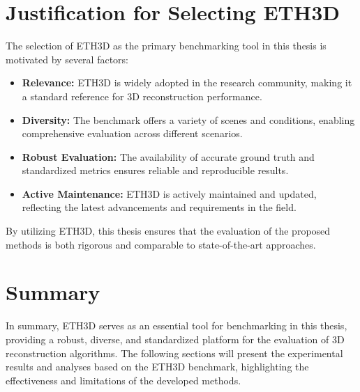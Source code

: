 \section{Justification for Selecting ETH3D}

The selection of ETH3D as the primary benchmarking tool in this thesis is motivated by several factors:

\begin{itemize}
    \item \textbf{Relevance:} ETH3D is widely adopted in the research community, making it a standard reference for 3D reconstruction performance.
    \item \textbf{Diversity:} The benchmark offers a variety of scenes and conditions, enabling comprehensive evaluation across different scenarios.
    \item \textbf{Robust Evaluation:} The availability of accurate ground truth and standardized metrics ensures reliable and reproducible results.
    \item \textbf{Active Maintenance:} ETH3D is actively maintained and updated, reflecting the latest advancements and requirements in the field.
\end{itemize}

By utilizing ETH3D, this thesis ensures that the evaluation of the proposed methods is both rigorous and comparable to state-of-the-art approaches.

\section{Summary}

In summary, ETH3D serves as an essential tool for benchmarking in this thesis, providing a robust, diverse, and standardized platform for the evaluation of 3D reconstruction algorithms. The following sections will present the experimental results and analyses based on the ETH3D benchmark, highlighting the effectiveness and limitations of the developed methods.
